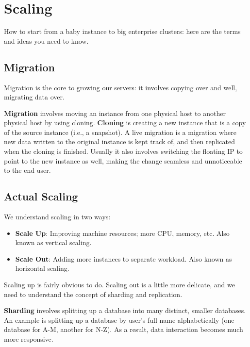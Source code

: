 \documentclass{report}
\newcommand{\npar}{\par\noindent}
\newcommand{\vpar}{\vspace{1em}\npar}
\begin{document}
\chapter{Scaling}

How to start from a baby instance to big enterprise clusters: here are the terms and ideas you need to know.

\section{Migration}

\par Migration is the core to growing our servers: it involves copying over and well, migrating data over.

\vpar \textbf{Migration} involves moving an instance from one physical host to another physical host by using cloning. \textbf{Cloning} is creating a new instance that is a copy of the source instance (i.e., a snapshot). A live migration is a migration where new data written to the original instance is kept track of, and then replicated when the cloning is finished. Usually it also involves switching the floating IP to point to the new instance as well, making the change seamless and unnoticeable to the end user.

\section{Actual Scaling}

\par We understand scaling in two ways:

\begin{itemize}
    \item \textbf{Scale Up}: Improving machine resources; more CPU, memory, etc. Also known as vertical scaling.
    \item \textbf{Scale Out}: Adding more instances to separate workload. Also known as horizontal scaling.
\end{itemize}

\npar Scaling up is fairly obvious to do. Scaling out is a little more delicate, and we need to understand the concept of sharding and replication.

\vpar \textbf{Sharding} involves splitting up a database into many distinct, smaller databases. An example is splitting up a database by user's full name alphabetically (one database for A-M, another for N-Z). As a result, data interaction becomes much more responsive. 
\end{document}
